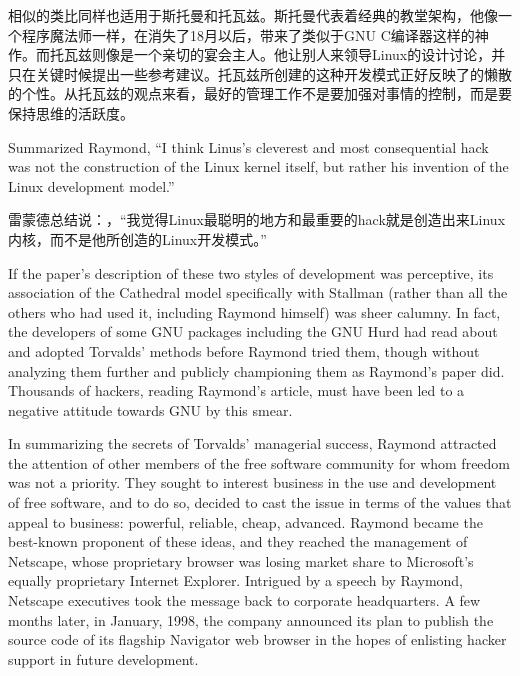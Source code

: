 \ifdefined\chs
相似的类比同样也适用于斯托曼和托瓦兹。斯托曼代表着经典的教堂架构，他像一个程序魔法师一样，在消失了18月以后，带来了类似于GNU C编译器这样的神作。而托瓦兹则像是一个亲切的宴会主人。他让别人来领导Linux的设计讨论，并只在关键时候提出一些参考建议。托瓦兹所创建的这种开发模式正好反映了的懒散的个性。从托瓦兹的观点来看，最好的管理工作不是要加强对事情的控制，而是要保持思维的活跃度。
\fi

\ifdefined\eng
Summarized Raymond, ``I think Linus's cleverest and most consequential hack was not the construction of the Linux kernel itself, but rather his invention of the Linux development model.''
\fi

\ifdefined\chs
雷蒙德总结说：，“我觉得Linux最聪明的地方和最重要的hack就是创造出来Linux内核，而不是他所创造的Linux开发模式。”
\fi

\ifdefined\eng
If the paper's description of these two styles of development was perceptive, its association of the Cathedral model specifically with Stallman (rather than all the others who had used it, including Raymond himself) was sheer calumny.  In fact, the developers of some GNU packages including the GNU Hurd had read about and adopted Torvalds' methods before Raymond tried them, though without analyzing them further and publicly championing them as Raymond's paper did. Thousands of hackers, reading Raymond's article, must have been led to a negative attitude towards GNU by this smear.
\fi

\ifdefined\chs

\fi

\ifdefined\eng
In summarizing the secrets of Torvalds' managerial success, Raymond attracted the attention of other members of the free software community for whom freedom was not a priority.  They sought to interest business in the use and development of free software, and to do so, decided to cast the issue in terms of the values that appeal to business: powerful, reliable, cheap, advanced.  Raymond became the best-known proponent of these ideas, and they reached the management of Netscape, whose proprietary browser was losing market share to Microsoft's equally proprietary Internet Explorer.  Intrigued by a speech by Raymond, Netscape executives took the message back to corporate headquarters. A few months later, in January, 1998, the company announced its plan to publish the source code of its flagship Navigator web browser in the hopes of enlisting hacker support in future development.
\fi


